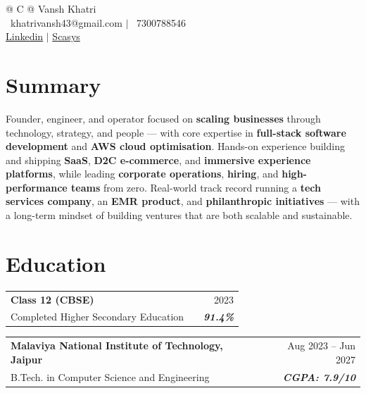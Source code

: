 \documentclass[a4paper,10pt]{article}
\begin{document}
\pagestyle{empty}

\begin{tabularx}{\linewidth}{@{} C @{}}
\color[HTML]{1C033C} \Huge{Vansh Khatri} \\[1pt]
\textcolor[HTML]{371e77}{{\faEnvelope\ khatrivansh43@gmail.com}} $|$
\textcolor[HTML]{371e77}{{\faMobile\ 7300788546}} \\[1pt]
\textcolor[HTML]{371e77}{\href{https://www.linkedin.com/in/vansh-khatri-3589b1282/}{\raisebox{-0.05\height}{\faLinkedin} Linkedin}}
$|$
\textcolor[HTML]{371e77}{\href{https://scasys.in}{\raisebox{-0.05\height}{\faBuilding} Scasys}}
\end{tabularx}

\section{Summary}
\textcolor[HTML]{1C033C}{
Founder, engineer, and operator focused on \textbf{scaling businesses} through technology, strategy, and people — with core expertise in \textbf{full-stack software development} and \textbf{AWS cloud optimisation}. Hands-on experience building and shipping \textbf{SaaS}, \textbf{D2C e-commerce}, and \textbf{immersive experience platforms}, while leading \textbf{corporate operations}, \textbf{hiring}, and \textbf{high-performance teams} from zero. Real-world track record running a \textbf{tech services company}, an \textbf{EMR product}, and \textbf{philanthropic initiatives} — with a long-term mindset of building ventures that are both scalable and sustainable.
}

\section{Education}
\begin{tabularx}{\linewidth}{ @{}l X r@{} }
\color[HTML]{1C033C} \textbf{Class 12 (CBSE)} & \hfill & \color[HTML]{371e77} 2023 \\
\color[HTML]{371e77} Completed Higher Secondary Education & \hfill & \color[HTML]{4B28A4} \textit{\textbf{91.4\%}} \\
\end{tabularx}
\vspace{-2pt}
\begin{tabularx}{\linewidth}{ @{}l X r@{} }
\color[HTML]{1C033C} \textbf{Malaviya National Institute of Technology, Jaipur} & \hfill & \color[HTML]{371e77} Aug 2023 -- Jun 2027 \\
\color[HTML]{371e77} B.Tech. in Computer Science and Engineering & \hfill & \color[HTML]{4B28A4} \textit{\textbf{CGPA: 7.9/10}} \\
\end{tabularx}
\end{document}
